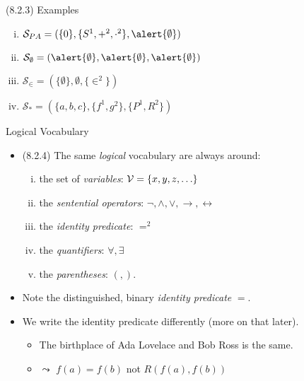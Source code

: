 \begin{frame}{(8.2.3) Examples}

	\begin{enumerate}[(i)]
			
				\item $\mathcal{S}_{PA}=(\{0\}, \{S^1, +^2, \cdot^2\}, \alert{\emptyset})$ 
				
				\item $\mathcal{S}_\emptyset=(\alert{\emptyset},\alert{\emptyset},\alert{\emptyset})$
				
				\item $\mathcal{S}_\in=(\{\emptyset\}, \emptyset, \{\in^2\})$
			
			
				\item$\mathcal{S_\ast}=(\{a,b,c\}, \{f^1, g^2\}, \{P^1, R^2\})$			
			\end{enumerate}	
\end{frame}

\begin{frame}{Logical Vocabulary}

	\begin{itemize}%
	\itemsep=16pt
	
		\item (8.2.4) The same \emph{logical} vocabulary are always around:
		\begin{enumerate}[(i)]
		
			\item the set of \emph{variables}: $\mathcal{V}=\{x,y,z,\mathellipsis\}$
			
			\item the \emph{sentential operators}: $\neg,\land,\lor,\to,\leftrightarrow$
			
			\item the \emph{identity predicate}: \alert{$=^2$}
			
			\item the \emph{quantifiers}: $\forall,\exists$
			
			\item the \emph{parentheses}: $(,)$.
		
		\end{enumerate}

		\item Note the distinguished, binary \emph{identity predicate} $=$.
		
		\item We write the identity predicate differently (more on that later).
		
			\begin{itemize}
			
				\item[] The birthplace of Ada Lovelace and Bob Ross is the same.
				
				\item[] \; $\leadsto$ $f(a)=f(b)$ \;\; \alert{not} $R(f(a),f(b))$
			
			\end{itemize}
	
	\end{itemize}

\end{frame}

